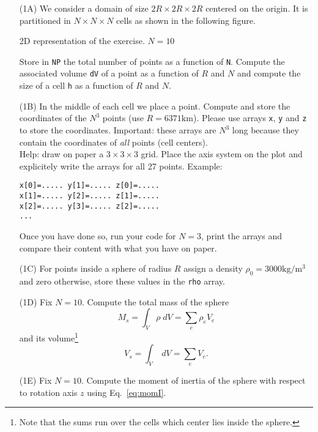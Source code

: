 \begin{itemize}
\item[(1A)] We consider a domain of size $2R\times 2R \times 2R$ centered on the origin. It is 
partitioned in $N\times N \times N$ cells as shown in the following figure.

\begin{center}

{\captionfont 2D representation of the exercise. $N=10$}
\end{center}


Store in {\tt NP} the total number of points as a function of {\tt N}.
Compute the associated volume {\tt dV} of a point as a function of $R$ and $N$ and  
compute the size of a cell {\tt h} as a function of $R$ and $N$. 

\item[(1B)] 
In the middle of each cell we place a point. Compute and store the coordinates 
of the $N^3$ points (use $R=6371\si{\kilo\metre}$). Please use 
arrays {\tt x}, {\tt y} and {\tt z} to store the coordinates.
Important: these arrays are $N^3$ long because they contain the coordinates of {\it all} points (cell centers).\\
Help: draw on paper a $3\times3\times3$ grid. Place the axis system on the plot and explicitely write the arrays 
for all 27 points. Example:
\begin{verbatim}
x[0]=..... y[1]=..... z[0]=.....
x[1]=..... y[2]=..... z[1]=.....
x[2]=..... y[3]=..... z[2]=.....
...
\end{verbatim}
Once you have done so, run your code for $N=3$, print the arrays and compare their content with what you 
have on paper.


\item[(1C)] For points inside a sphere of radius $R$ assign a 
density $\rho_0=3000\si{\kilo\gram\per\cubic\metre}$ 
and zero otherwise, store these values in the {\tt rho} array.

\item[(1D)] Fix $N=10$. Compute the total mass of the sphere
\[
M_s = \int_V \rho \; dV = \sum_{e} \rho_e V_e
\] 
and its volume\footnote{Note that the sums run over the cells which center lies inside the sphere.}
\[
V_s = \int_V \; dV = \sum_{e}  V_e.
\] 

\item[(1E)] Fix $N=10$. Compute the moment of inertia of the sphere 
with respect to rotation axis $z$ using Eq.~\eqref{eq:momI}. 


\end{itemize}
